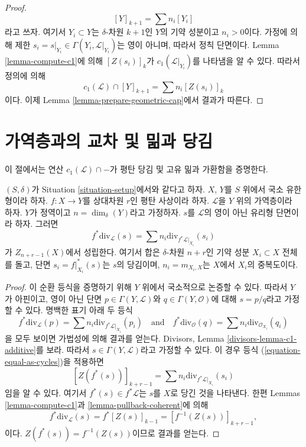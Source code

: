\begin{proof}
$$
[Y]_{k + 1} = \sum n_i[Y_i]
$$
라고 쓰자. 여기서 $Y_i \subset Y$는 $\delta$-차원 $k + 1$인 $Y$의
기약 성분이고 $n_i > 0$이다. 가정에 의해 제한
$s_i = s|_{Y_i} \in \Gamma(Y_i, \mathcal{L}|_{Y_i})$는 영이 아니며,
따라서 정칙 단면이다. Lemma \ref{lemma-compute-c1}에 의해
$[Z(s_i)]_k$가 $c_1(\mathcal{L}|_{Y_i})$를 나타냄을 알 수 있다.
따라서 정의에 의해
$$
c_1(\mathcal{L}) \cap [Y]_{k + 1} = \sum n_i[Z(s_i)]_k
$$
이다. 이제 Lemma \ref{lemma-prepare-geometric-cap}에서 결과가 따른다.
\end{proof}




\section{가역층과의 교차 및 밂과 당김}
\label{section-intersecting-with-divisors-push-pull}

\noindent
이 절에서는 연산 $c_1(\mathcal{L}) \cap -$가 평탄 당김 및 고유 밂과
가환함을 증명한다.

\begin{lemma}
\label{lemma-prepare-flat-pullback-cap-c1}
$(S, \delta)$가 Situation \ref{situation-setup}에서와 같다고 하자.
$X$, $Y$를 $S$ 위에서 국소 유한형이라 하자. $f : X \to Y$를 상대차원
$r$인 평탄 사상이라 하자. $\mathcal{L}$을 $Y$ 위의 가역층이라 하자.
$Y$가 정역이고 $n = \dim_\delta(Y)$라고 가정하자. $s$를
$\mathcal{L}$의 영이 아닌 유리형 단면이라 하자. 그러면
$$
f^*\text{div}_\mathcal{L}(s) = \sum n_i\text{div}_{f^*\mathcal{L}|_{X_i}}(s_i)
$$
가 $Z_{n + r - 1}(X)$에서 성립한다. 여기서 합은 $\delta$-차원
$n + r$인 기약 성분 $X_i \subset X$ 전체를 돌고, 단면
$s_i = f|_{X_i}^*(s)$는 $s$의 당김이며,
$n_i = m_{X_i, X}$는 $X$에서 $X_i$의 중복도이다.
\end{lemma}

\begin{proof}
이 순환 등식을 증명하기 위해 $Y$ 위에서 국소적으로 논증할 수 있다.
따라서 $Y$가 아핀이고, 영이 아닌 단면
$p \in \Gamma(Y, \mathcal{L})$와 $q \in \Gamma(Y, \mathcal{O})$에 대해
$s = p/q$라고 가정할 수 있다. 명백한 표기 아래 두 등식
$$
f^*\text{div}_\mathcal{L}(p) =
\sum n_i\text{div}_{f^*\mathcal{L}|_{X_i}}(p_i)
\quad\text{and}\quad
f^*\text{div}_\mathcal{O}(q) =
\sum n_i\text{div}_{\mathcal{O}_{X_i}}(q_i)
$$
을 모두 보이면 가법성에 의해 결과를 얻는다. Divisors, Lemma
\ref{divisors-lemma-c1-additive}를 보라. 따라서
$s \in \Gamma(Y, \mathcal{L})$라고 가정할 수 있다. 이 경우 등식
(\ref{equation-equal-as-cycles})을 적용하면
$$
[Z(f^*(s))]_{k + r - 1} =
\sum n_i\text{div}_{f^*\mathcal{L}|_{X_i}}(s_i)
$$
임을 알 수 있다. 여기서 $f^*(s) \in f^*\mathcal{L}$는 $s$를 $X$로
당긴 것을 나타낸다. 한편 Lemmas \ref{lemma-compute-c1}과
\ref{lemma-pullback-coherent}에 의해
$$
f^*\text{div}_\mathcal{L}(s) = f^*[Z(s)]_{k - 1}
= [f^{-1}(Z(s))]_{k + r - 1},
$$
이다. $Z(f^*(s)) = f^{-1}(Z(s))$이므로 결과를 얻는다.
\end{proof}

